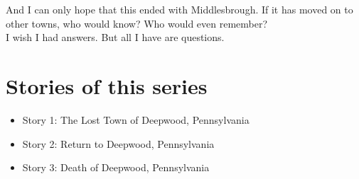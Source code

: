 \documentclass[a5paper]{scrartcl}
\begin{document}
And I can only hope that this ended with Middlesbrough. If it has moved on to other towns, who would know? Who would even remember? \\


I wish I had answers. But all I have are questions.
\clearpage
\section*{Stories of this series}

\begin{itemize}
    \item Story 1: The Lost Town of Deepwood, Pennsylvania
    \item Story 2: Return to Deepwood, Pennsylvania
    \item Story 3: Death of Deepwood, Pennsylvania
\end{itemize}
\end{document}
